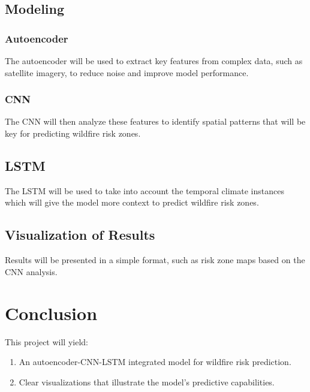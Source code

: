 \documentclass{article}
\begin{document}
\subsection{Modeling}
\subsubsection{Autoencoder}
The autoencoder will be used to extract key features from complex data,  such as satellite imagery, to reduce noise and improve model performance.

\subsubsection{CNN}
The CNN will then analyze these features to identify spatial patterns that will be key for predicting wildfire risk zones.

\subsection{LSTM}
The LSTM will be used to take into account the temporal climate instances which will give the model more context to predict wildfire risk zones.

\subsection{Visualization of Results}
Results will be presented in a simple format, such as risk zone maps based on the CNN analysis.

\section{Conclusion}
This project will yield:
\begin{enumerate}
    \item An autoencoder-CNN-LSTM integrated model for wildfire risk prediction.
    \item Clear visualizations that illustrate the model's predictive capabilities.
\end{enumerate}
\end{document}
